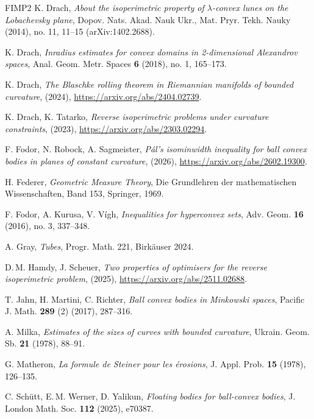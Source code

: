 \documentclass[12pt]{amsart}
\theoremstyle{theorem}
\theoremstyle{Intro}
\theoremstyle{definition}
\theoremstyle{remark}
\theoremstyle{claim}
\numberwithin{equation}{section}
\begin{document}
\begin{thebibliography}{FIMP2}
K. Drach, \emph{About the isoperimetric property of $\lambda$-convex lunes on the Lobachevsky plane}, Dopov. Nats. Akad. Nauk Ukr., Mat. Pryr. Tekh. Nauky (2014), no. 11, 11--15 (arXiv:1402.2688).

K. Drach, \emph{Inradius estimates for convex domains in 2-dimensional Alexandrov spaces}, Anal. Geom. Metr. Spaces \textbf{6} (2018), no. 1, 165--173. 

K. Drach, \emph{The Blaschke rolling theorem in Riemannian manifolds of bounded curvature}, (2024),  \url{https://arxiv.org/abs/2404.02739}.

K. Drach, K. Tatarko, \emph{Reverse isoperimetric problems under curvature constraints}, (2023),  \url{https://arxiv.org/abs/2303.02294}.

 F. Fodor, N. Robock, A. Sagmeister, \emph{P\'al's isominwidth inequality for ball convex bodies in planes of constant curvature}, (2026), \url{https://arxiv.org/abs/2602.19300}.


 H. Federer, \emph{Geometric Measure Theory},  Die Grundlehren der mathematischen Wissenschaften, Band 153, Springer, 1969.

  F. Fodor, A. Kurusa, V. V\'igh, \emph{Inequalities for hyperconvex sets}, Adv. Geom. {\bf16} (2016), no. 3, 337--348.

 A. Gray, \emph{Tubes}, Progr. Math. 221, Birk\"auser 2024.

D.\,M. Hamdy, J. Scheuer, \emph{Two properties of optimisers for the reverse isoperimetric problem}, (2025), \url{https://arxiv.org/abs/2511.02688}.

 T. Jahn, H. Martini, C. Richter, \emph{Ball convex bodies in Minkowski spaces}, Pacific J. Math. {\bf 289} (2) (2017), 287--316.


A. Milka, \emph{Estimates of the sizes of curves with bounded curvature}, Ukrain. Geom. Sb. \textbf{21} (1978), 88--91. 

G. Matheron, \emph{La formule de Steiner pour les érosions}, J. Appl. Prob. {\bf 15} (1978), 126--135.


 C. Sch\"utt, E.\,M. Werner, D. Yalikun, \emph{Floating bodies for ball-convex bodies}, J. London Math. Soc. {\bf 112} (2025), e70387. 


\end{thebibliography}
\end{document}
